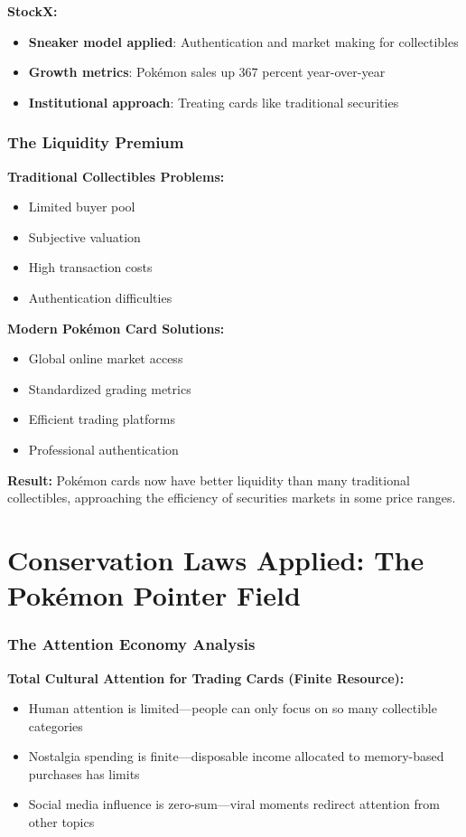 \documentclass[11pt,oneside]{book}
\begin{document}
\textbf{StockX:}
\begin{itemize}
\item \textbf{Sneaker model applied}: Authentication and market making for collectibles
\item \textbf{Growth metrics}: Pokémon sales up 367 percent year-over-year
\item \textbf{Institutional approach}: Treating cards like traditional securities
\end{itemize}

\subsubsection{The Liquidity Premium}

\textbf{Traditional Collectibles Problems:}
\begin{itemize}
\item Limited buyer pool
\item Subjective valuation
\item High transaction costs
\item Authentication difficulties
\end{itemize}

\textbf{Modern Pokémon Card Solutions:}
\begin{itemize}
\item Global online market access
\item Standardized grading metrics
\item Efficient trading platforms
\item Professional authentication
\end{itemize}

\textbf{Result:} Pokémon cards now have better liquidity than many traditional collectibles, approaching the efficiency of securities markets in some price ranges.

\section{Conservation Laws Applied: The Pokémon Pointer Field}

\subsubsection{The Attention Economy Analysis}

\textbf{Total Cultural Attention for Trading Cards (Finite Resource):}
\begin{itemize}
\item Human attention is limited—people can only focus on so many collectible categories
\item Nostalgia spending is finite—disposable income allocated to memory-based purchases has limits
\item Social media influence is zero-sum—viral moments redirect attention from other topics
\end{itemize}
\end{document}
